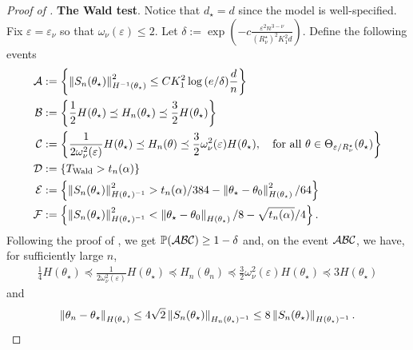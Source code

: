 \begin{proof}[Proof of ]
    \textbf{The Wald test}.
    Notice that $d_\star = d$ since the model is well-specified.
    Fix $\varepsilon = \varepsilon_\nu$ so that $\omega_\nu(\varepsilon) \le 2$.
    Let $\delta := \exp\left(-c \frac{\varepsilon^2 n^{3-\nu}}{(R_\nu^\star)^2 K_1^2 d} \right)$.
    Define the following events
    \begin{align}\label{eq:events_wald}
        \begin{split}
            \mathcal{A} &:= \left\{ \left\lVert S_n(\theta_\star) \right\rVert_{H^{-1}(\theta_\star)}^{2} \le C K_{1}^2 \log{(e / \delta)} \frac{d}{n} \right\} \\
            \mathcal{B} &:= \left\{ \frac12 H(\theta_\star) \preceq H_n(\theta_\star) \preceq \frac32 H(\theta_\star) \right\} \\
            \mathcal{C} &:= \left\{ \frac1{2 \omega_\nu^2(\varepsilon)} H(\theta_\star) \preceq H_n(\theta) \preceq \frac{3}{2} \omega_\nu^2(\varepsilon) H(\theta_\star), \quad \mbox{for all } \theta \in \Theta_{\varepsilon/R_\nu^\star}(\theta_\star) \right\} \\
            \mathcal{D} &:= \left\{ T_{\text{Wald}} > t_n(\alpha) \right\} \\
            \mathcal{E} &:= \left\{ \left\lVert S_n(\theta_\star) \right\rVert_{H(\theta_\star)^{-1}}^2 >  t_n(\alpha)/384 - \left\lVert \theta_\star - \theta_0 \right\rVert_{H(\theta_\star)}^2/64 \right\} \\
            \mathcal{F} &:= \left\{ \left\lVert S_n(\theta_\star) \right\rVert_{H(\theta_\star)^{-1}}^2 < \left\lVert \theta_\star - \theta_0 \right\rVert_{H(\theta_\star)}/8 - \sqrt{t_n(\alpha)}/4 \right\}.
        \end{split}
    \end{align}
    Following the proof of , we get $\operatorname{\mathbb P}(\mathcal{A} \mathcal{B} \mathcal{C}) \ge 1 - \delta$ and,
    on the event $\mathcal{A} \mathcal{B} \mathcal{C}$, we have, for sufficiently large $n$,
    \begin{align*}
        \frac1{4} H(\theta_\star) \preceq \frac1{2 \omega_\nu^2(\varepsilon)} H(\theta_\star) \preceq H_n(\theta_n) \preceq \frac32 \omega_\nu^2(\varepsilon) H(\theta_\star) \preceq 3 H(\theta_\star)
    \end{align*}
    and
    \begin{align}\label{eq:alt_local}
        \left\lVert \theta_n - \theta_\star \right\rVert_{H(\theta_\star)} \le 4\sqrt{2} \left\lVert S_n(\theta_\star) \right\rVert_{H_n(\theta_\star)^{-1}} \le 8 \left\lVert S_n(\theta_\star) \right\rVert_{H(\theta_\star)^{-1}}.
    \end{align}
    

\end{proof}
